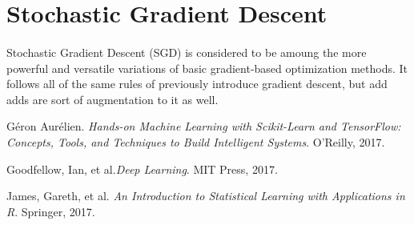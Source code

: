 \documentclass[12pt,letterpaper]{article}
\begin{document}

\section{Stochastic Gradient Descent}

\paragraph*{}Stochastic Gradient Descent (SGD) is considered to be amoung the more powerful and versatile variations of basic gradient-based optimization methods. It follows all of the same rules of previously introduce gradient descent, but add adds are sort of augmentation to it as well.





\begin{thebibliography}{9}


Géron Aurélien. \textit{Hands-on Machine Learning with Scikit-Learn and TensorFlow: Concepts, Tools, and Techniques to Build Intelligent Systems}. O'Reilly, 2017.

Goodfellow, Ian, et al.\textit{Deep Learning}. MIT Press, 2017.

James, Gareth, et al. \textit{An Introduction to Statistical Learning with Applications in R}. Springer, 2017.


\end{thebibliography}


\end{document}
